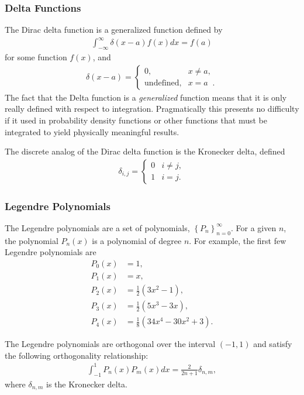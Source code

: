 \documentclass[11pt]{article}
\begin{document}
\subsubsection{Delta Functions}
\label{sec:orgheadline63}
The Dirac delta function is a generalized function defined by
\begin{align}
  \int_{-\infty}^\infty \delta(x-a) f(x) dx = f(a)
\end{align}
for some function \(f(x)\), and
\begin{align}
  \delta(x-a) = 
  \begin{cases}
    0, & x\neq a, \\
    \text{undefined}, & x=a \;\;.
  \end{cases}
\end{align}
The fact that the Delta function is a \emph{generalized} function means that it is only really defined with respect to integration.  Pragmatically this presents no difficulty if it used in probability density functions or other functions that must be integrated to yield physically meaningful results.

The discrete analog of the Dirac delta function is the Kronecker delta, defined
\begin{align}
  \delta_{i,j} = 
  \begin{cases}
    0 & i \neq j, \\
    1 & i = j.
  \end{cases}
\end{align}
\subsubsection{Legendre Polynomials}
\label{sec:orgheadline64}
The Legendre polynomials are a set of polynomials, \(\left\{ P_n \right\}_{n=0}^\infty\).  For a given \(n\), the polynomial \(P_n(x)\) is a polynomial of degree \(n\).  For example, the first few Legendre polynomials are
\begin{align*}
  P_0(x) &= 1, \\
  P_1(x) &= x, \\
  P_2(x) &= \frac{1}{2}\left(3 x^2 - 1 \right), \\
  P_3(x) &= \frac{1}{2}\left(5 x^3 - 3 x \right), \\
  P_4(x) &= \frac{1}{8}\left(34 x^4 - 30 x^2 + 3 \right).
\end{align*}

The Legendre polynomials are orthogonal over the interval \((-1, 1)\) and satisfy the following orthogonality relationship:
\begin{align}
  \int_{-1}^1 P_n(x) P_m(x) dx = \frac{2}{2n+1} \delta_{n,m},
\end{align}
where \(\delta_{n,m}\) is the Kronecker delta.
\end{document}
